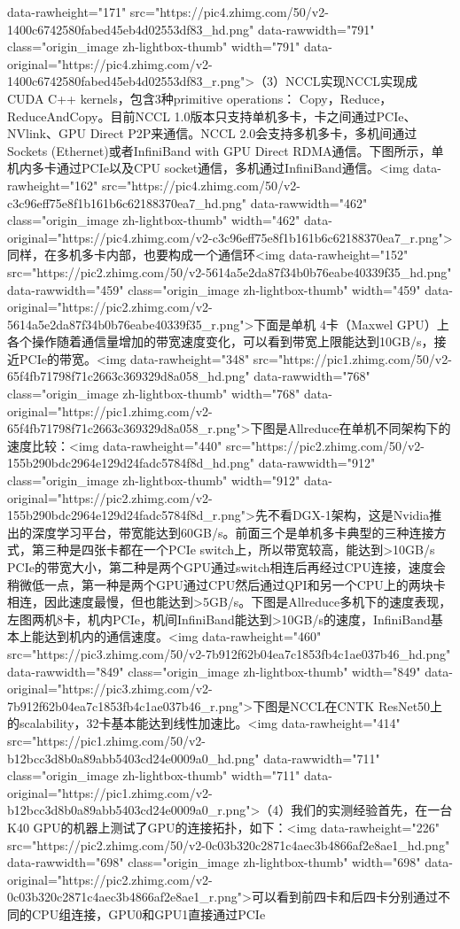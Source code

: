 data-rawheight="171" src="https://pic4.zhimg.com/50/v2-1400c6742580fabed45eb4d02553df83_hd.png" data-rawwidth="791" class="origin_image zh-lightbox-thumb" width="791" data-original="https://pic4.zhimg.com/v2-1400c6742580fabed45eb4d02553df83_r.png">（3）NCCL实现NCCL实现成CUDA C++ kernels，包含3种primitive operations： Copy，Reduce，ReduceAndCopy。目前NCCL 1.0版本只支持单机多卡，卡之间通过PCIe、NVlink、GPU Direct P2P来通信。NCCL 2.0会支持多机多卡，多机间通过Sockets (Ethernet)或者InfiniBand with GPU Direct RDMA通信。下图所示，单机内多卡通过PCIe以及CPU socket通信，多机通过InfiniBand通信。<img data-rawheight="162" src="https://pic4.zhimg.com/50/v2-c3c96eff75e8f1b161b6c62188370ea7_hd.png" data-rawwidth="462" class="origin_image zh-lightbox-thumb" width="462" data-original="https://pic4.zhimg.com/v2-c3c96eff75e8f1b161b6c62188370ea7_r.png">同样，在多机多卡内部，也要构成一个通信环<img data-rawheight="152" src="https://pic2.zhimg.com/50/v2-5614a5e2da87f34b0b76eabe40339f35_hd.png" data-rawwidth="459" class="origin_image zh-lightbox-thumb" width="459" data-original="https://pic2.zhimg.com/v2-5614a5e2da87f34b0b76eabe40339f35_r.png">下面是单机 4卡（Maxwel GPU）上各个操作随着通信量增加的带宽速度变化，可以看到带宽上限能达到10GB/s，接近PCIe的带宽。<img data-rawheight="348" src="https://pic1.zhimg.com/50/v2-65f4fb71798f71c2663c369329d8a058_hd.png" data-rawwidth="768" class="origin_image zh-lightbox-thumb" width="768" data-original="https://pic1.zhimg.com/v2-65f4fb71798f71c2663c369329d8a058_r.png">下图是Allreduce在单机不同架构下的速度比较：<img data-rawheight="440" src="https://pic2.zhimg.com/50/v2-155b290bdc2964e129d24fadc5784f8d_hd.png" data-rawwidth="912" class="origin_image zh-lightbox-thumb" width="912" data-original="https://pic2.zhimg.com/v2-155b290bdc2964e129d24fadc5784f8d_r.png">先不看DGX-1架构，这是Nvidia推出的深度学习平台，带宽能达到60GB/s。前面三个是单机多卡典型的三种连接方式，第三种是四张卡都在一个PCIe switch上，所以带宽较高，能达到>10GB/s PCIe的带宽大小，第二种是两个GPU通过switch相连后再经过CPU连接，速度会稍微低一点，第一种是两个GPU通过CPU然后通过QPI和另一个CPU上的两块卡相连，因此速度最慢，但也能达到>5GB/s。下图是Allreduce多机下的速度表现，左图两机8卡，机内PCIe，机间InfiniBand能达到>10GB/s的速度，InfiniBand基本上能达到机内的通信速度。<img data-rawheight="460" src="https://pic3.zhimg.com/50/v2-7b912f62b04ea7c1853fb4c1ae037b46_hd.png" data-rawwidth="849" class="origin_image zh-lightbox-thumb" width="849" data-original="https://pic3.zhimg.com/v2-7b912f62b04ea7c1853fb4c1ae037b46_r.png">下图是NCCL在CNTK ResNet50上的scalability，32卡基本能达到线性加速比。<img data-rawheight="414" src="https://pic1.zhimg.com/50/v2-b12bcc3d8b0a89abb5403cd24e0009a0_hd.png" data-rawwidth="711" class="origin_image zh-lightbox-thumb" width="711" data-original="https://pic1.zhimg.com/v2-b12bcc3d8b0a89abb5403cd24e0009a0_r.png">（4）我们的实测经验首先，在一台K40 GPU的机器上测试了GPU的连接拓扑，如下：<img data-rawheight="226" src="https://pic2.zhimg.com/50/v2-0c03b320c2871c4aec3b4866af2e8ae1_hd.png" data-rawwidth="698" class="origin_image zh-lightbox-thumb" width="698" data-original="https://pic2.zhimg.com/v2-0c03b320c2871c4aec3b4866af2e8ae1_r.png">可以看到前四卡和后四卡分别通过不同的CPU组连接，GPU0和GPU1直接通过PCIe 